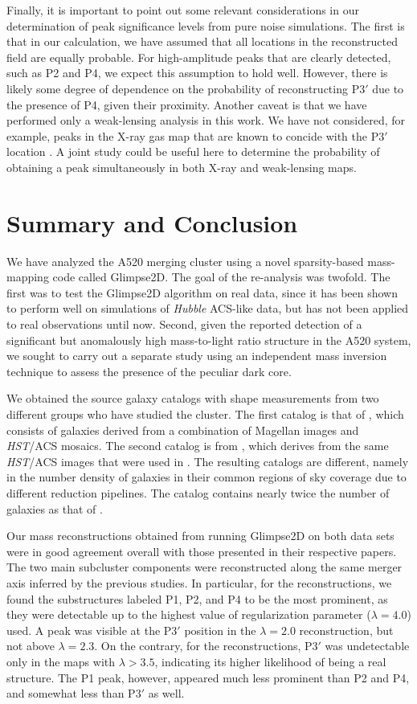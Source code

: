 \documentclass[iop,twocolappendix]{emulateapj}
\newcommand{\cta}[1]{\citetalias{#1}}
\begin{document}
Finally, it is important to point out some relevant considerations in our determination of peak 
significance levels from pure noise simulations. The first is that in our calculation, we have assumed that all
locations in the reconstructed field are equally probable. For high-amplitude peaks that are clearly detected, 
such as P2 and P4, we expect this assumption to hold well. However, there is likely some degree of 
dependence on the probability of reconstructing P3$'$ due to the presence of P4, given their proximity.
Another caveat is that we have performed only a weak-lensing analysis in this work. We have not considered, 
for example, peaks in the X-ray gas map that are known to concide with the P3$'$ location \citep{WMG.2016}. 
A joint study could be useful here to determine the probability of obtaining a peak simultaneously in both 
X-ray and weak-lensing maps.

\section{Summary and Conclusion}\label{sec:conclusion}
We have analyzed the A520 merging cluster using a novel sparsity-based mass-mapping code called Glimpse2D. 
The goal of the re-analysis was twofold. The first was to test the Glimpse2D algorithm on real data, since it
has been shown to perform well on simulations of \textit{Hubble} ACS-like data, but has not been applied
to real observations until now.
Second, given the reported detection of a significant but anomalously high mass-to-light ratio structure 
in the A520 system, we sought to carry out a separate study using an independent mass inversion 
technique to assess the presence of the peculiar dark core. 

We obtained the source galaxy catalogs with shape measurements from two different groups who have 
studied the cluster. The first catalog is that of \cta{C12}, which consists of galaxies derived from
a combination of Magellan images and \textit{HST}/ACS mosaics. The second catalog is from \cta{J14},
which derives from the same \textit{HST}/ACS images that were used in \cta{C12}. The resulting catalogs
are different, namely in the number density of galaxies in their common regions of sky coverage
due to different reduction pipelines. The \cta{J14} catalog contains nearly twice the number of galaxies
as that of \cta{C12}.

Our mass reconstructions obtained from running Glimpse2D on both data sets were in good agreement overall 
with those presented in their respective papers. The two main subcluster components were reconstructed along 
the same merger axis inferred by the previous studies. In particular, for the \cta{C12} reconstructions, we 
found the substructures labeled P1, P2, and P4 to be the most prominent, as they were detectable up 
to the highest value of regularization parameter ($\lambda=4.0$) used. 
A peak was visible at the P3$'$ position in the 
$\lambda=2.0$ reconstruction, but not above $\lambda=2.3$. On the contrary, for the \cta{J14} 
reconstructions, P3$'$ was undetectable only in the maps with $\lambda > 3.5$, indicating its higher likelihood 
of being a real structure. The P1 peak, however, appeared much less prominent than P2 and P4, and somewhat
less than P3$'$ as well.
\end{document}
